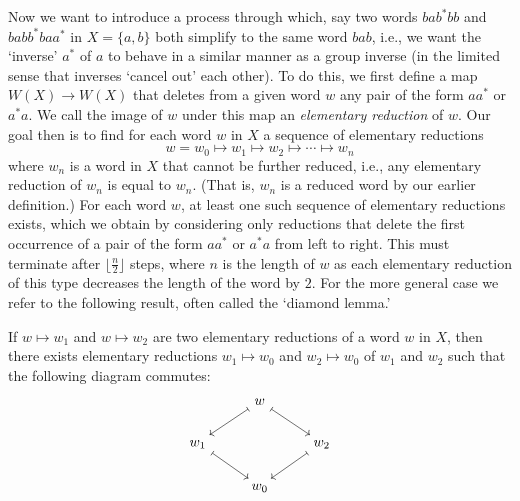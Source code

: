\begin{sectionthm}
    Now we want to introduce a process through which, say two words \(bab^*bb\)
    and \(babb^*baa^*\) in \(X = \{a, b\}\) both simplify to the same word
    \(bab\), i.e., we want the `inverse' \(a^*\) of \(a\) to behave in a similar
    manner as a group inverse (in the limited sense that inverses `cancel out'
    each other). To do this, we first define a map \(W(X) \to W(X)\) that
    deletes from a given word \(w\) any pair of the form \(aa^*\) or \(a^*a\).
    We call the image of \(w\) under this map an \emph{elementary reduction} of
    \(w\). Our goal then is to find for each word \(w\) in \(X\) a sequence of
    elementary reductions
    \[
        w = w_0 \mapsto w_1 \mapsto w_2 \mapsto \cdots \mapsto w_n
    \]
    where \(w_n\) is a word in \(X\) that cannot be further reduced, i.e., any
    elementary reduction of \(w_n\) is equal to \(w_n\). (That is, \(w_n\) is a
    reduced word by our earlier definition.) For each word \(w\), at least one
    such sequence of elementary reductions exists, which we obtain by
    considering only reductions that delete the first occurrence of a pair of
    the form \(aa^*\) or \(a^*a\) from left to right. This must terminate after
    \(\lfloor \frac{n}{2} \rfloor\) steps, where \(n\) is the length of \(w\) as
    each elementary reduction of this type decreases the length of the word by
    \(2\). For the more general case we refer to the following result, often
    called the `diamond lemma.'
\end{sectionthm}

\begin{lemma}
    If \(w \mapsto w_1\) and \(w \mapsto w_2\) are two elementary reductions of
    a word \(w\) in \(X\), then there exists elementary reductions \(w_1 \mapsto
    w_0\) and \(w_2 \mapsto w_0\) of \(w_1\) and \(w_2\) such that the following
    diagram commutes:
    \[
        \begin{tikzcd}
            & w \arrow[ld, maps to] \arrow[rd, maps to] &                \\
            w_1 \arrow[rd, maps to] &                         & w_2 \arrow[ld, maps to] \\
                        & w_0                     &               
        \end{tikzcd}
    \]
\end{lemma}


